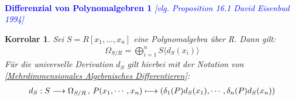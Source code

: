 \documentclass[10pt,a4paper]{report}
\newcommand{\ModulsOfDifferenzials}{David Eisenbud 1994}
\newcounter{Aussage}[chapter]
\newtheorem{korrolar}[Aussage]{Korrolar}
\newcommand{\function}[5]{\nolinebreak{#1:#2 \longrightarrow #3 \, , \, #4 \longmapsto #5}}
\newcommand{\divR}[2]{\Omega_{#1/#2}}
\newcommand{\divf}[1]{d_{#1}}
\begin{document}
\ \\
\textcolor{blue}{\textbf{Differenzial von Polynomalgebren 1} \textit{[vlg. Proposition 16.1 \ModulsOfDifferenzials]}}
\begin{korrolar}\label{Differenzial von Polynomalgebren 1}
Sei $S = R[x_1,...,x_n]$ eine Polynomalgebra über R. Dann gilt:
\begin{gather*}
\divR{S}{R} = \bigoplus_{i = 1}^n S \langle \divf{S}(x_i) \rangle 
\end{gather*}
Für die universelle Derivation $\divf{S}$ gilt hierbei mit der Notation von \cref{Mehrdimmensionales Algebraisches Differentieren}:
\begin{gather*}
\function{\divf{S}}{S}{\divR{S}{R}}{P(x_1,\cdots,x_n)}{(\delta_{1}(P)\divf{S}(x_1), \cdots , \delta_{n}(P)\divf{S}(x_n))}
\end{gather*}
\end{korrolar}
\end{document}
